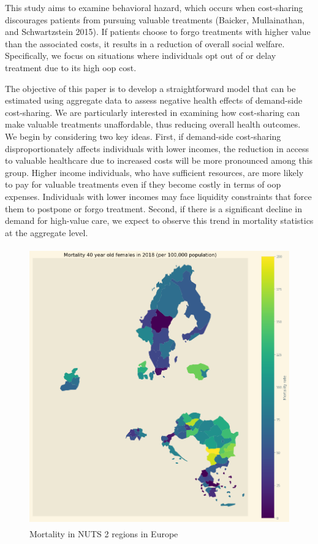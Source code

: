 \documentclass[a4paper,12pt]{article}
\makeatletter
\newcommand{\citeprocitem}[2]{\hyper@linkstart{cite}{citeproc_bib_item_#1}#2\hyper@linkend}
\makeatother
\begin{document}
This study aims to examine behavioral hazard, which occurs when cost-sharing discourages patients from pursuing valuable treatments (\citeprocitem{1}{Baicker, Mullainathan, and Schwartzstein 2015}). If patients choose to forgo treatments with higher value than the associated costs, it results in a reduction of overall social welfare. Specifically, we focus on situations where individuals opt out of or delay treatment due to its high oop cost.

The objective of this paper is to develop a straightforward model that can be estimated using aggregate data to assess negative health effects of demand-side cost-sharing. We are particularly interested in examining how cost-sharing can make valuable treatments unaffordable, thus reducing overall health outcomes. We begin by considering two key ideas. First, if demand-side cost-sharing disproportionately affects individuals with lower incomes, the reduction in access to valuable healthcare due to increased costs will be more pronounced among this group. Higher income individuals, who have sufficient resources, are more likely to pay for valuable treatments even if they become costly in terms of oop expenses. Individuals with lower incomes may face liquidity constraints that force them to postpone or forgo treatment. Second, if there is a significant decline in demand for high-value care, we expect to observe this trend in mortality statistics at the aggregate level.

\begin{figure}[htbp]
\centering
\includegraphics[height=12cm]{./figures/Europe_mortality_40_F_2018.png}
\caption{\label{fig:EUmap}Mortality in NUTS 2 regions in Europe}
\end{figure}
\end{document}
